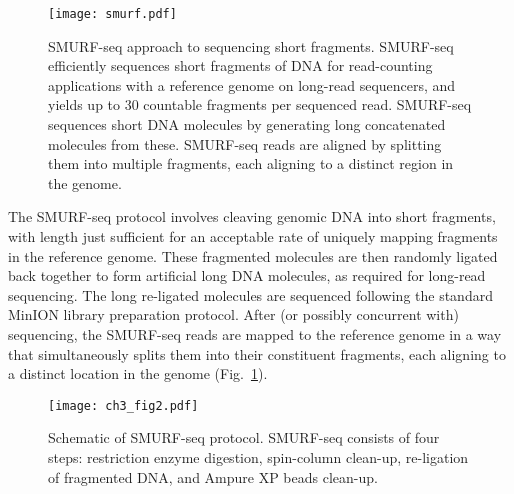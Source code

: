 \begin{figure}[b!]
\centering
\texttt{[image: smurf.pdf]}
\caption[SMURF-seq approach to sequencing short fragments]{
  SMURF-seq approach to sequencing short fragments.
  SMURF-seq efficiently sequences short fragments of DNA for
  read-counting applications with a reference genome on long-read
  sequencers, and yields up to 30 countable fragments per sequenced read.
  SMURF-seq sequences short DNA molecules by generating long concatenated
  molecules from these.  SMURF-seq reads are aligned by splitting them
  into multiple fragments, each aligning to a distinct region in the
  genome.}
\label{smurf}
\end{figure}

The SMURF-seq protocol involves cleaving genomic DNA into short
fragments, with length just sufficient for an acceptable rate of
uniquely mapping fragments in the reference genome.  These fragmented
molecules are then randomly ligated back together to form artificial
long DNA molecules, as required for long-read sequencing. The long
re-ligated molecules are sequenced following the standard MinION library
preparation protocol. After (or possibly concurrent with) sequencing,
the SMURF-seq reads are mapped to the reference genome in a way that
simultaneously splits them into their constituent fragments, each
aligning to a distinct location in the genome (Fig.~\ref{smurf}).

\begin{figure}[b!]
\centering
\texttt{[image: ch3\_fig2.pdf]}
\caption[Schematic of SMURF-seq protocol]{
  Schematic of SMURF-seq protocol. SMURF-seq consists of four
  steps: restriction enzyme digestion, spin-column clean-up, re-ligation
  of fragmented DNA, and Ampure XP beads clean-up.}
\label{protocol}
\end{figure}

